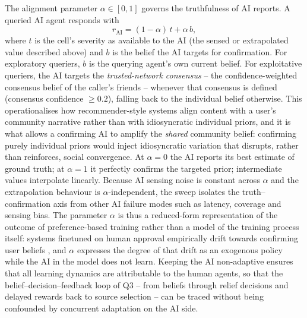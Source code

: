 \documentclass[pdflatex,sn-basic]{sn-jnl}
\begin{document}
The alignment parameter $\alpha \in [0, 1]$ governs the truthfulness of AI reports. A queried AI agent responds with
\begin{equation}
r_{\text{AI}} = (1 - \alpha)\, t + \alpha\, b,
\label{eq:alignment}
\end{equation}
where $t$ is the cell's severity as available to the AI (the sensed or extrapolated value described above) and $b$ is the belief the AI targets for confirmation. For exploratory queriers, $b$ is the querying agent's own current belief. For exploitative queriers, the AI targets the \emph{trusted-network consensus} -- the confidence-weighted consensus belief of the caller's friends -- whenever that consensus is defined (consensus confidence $\geq 0.2$), falling back to the individual belief otherwise. This operationalises how recommender-style systems align content with a user's community narrative rather than with idiosyncratic individual priors, and it is what allows a confirming AI to amplify the \emph{shared} community belief: confirming purely individual priors would inject idiosyncratic variation that disrupts, rather than reinforces, social convergence. At $\alpha = 0$ the AI reports its best estimate of ground truth; at $\alpha = 1$ it perfectly confirms the targeted prior; intermediate values interpolate linearly. Because AI sensing noise is constant across $\alpha$ and the extrapolation behaviour is $\alpha$-independent, the sweep isolates the truth--confirmation axis from other AI failure modes such as latency, coverage and sensing bias. The parameter $\alpha$ is thus a reduced-form representation of the outcome of preference-based training rather than a model of the training process itself: systems finetuned on human approval \citep{christiano2017deep,ouyang2022training} empirically drift towards confirming user beliefs \citep{sharma2024sycophancy}, and $\alpha$ expresses the degree of that drift as an exogenous policy while the AI in the model does not learn. Keeping the AI non-adaptive ensures that all learning dynamics are attributable to the human agents, so that the belief--decision--feedback loop of Q3 -- from beliefs through relief decisions and delayed rewards back to source selection -- can be traced without being confounded by concurrent adaptation on the AI side.
\end{document}
